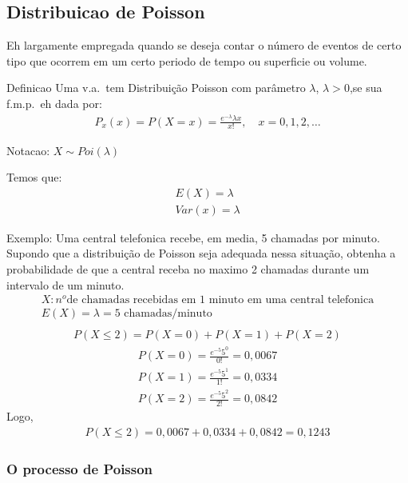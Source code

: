 \documentclass[11pt,a4paper]{book}
\begin{document}
\subsection{Distribuicao de Poisson}
Eh largamente empregada quando se deseja contar o número de eventos de certo tipo
que ocorrem em um certo periodo de tempo ou superficie ou volume.
\begin{description}
\item{Definicao} Uma v.a.\ tem Distribuição Poisson com parâmetro $\lambda$, $\lambda >0$,se sua
  f.m.p.\ eh dada por:
 \begin{align}
   P_{x} (x)= P(X=x)= \frac{e^{-\lambda}\lambda{x}}{x!}, \quad x=0,1,2,\ldots
 \end{align} 
 \item{Notacao}: $X \mathtt{\sim} Poi(\lambda)$
 \item{Temos que}:
   \begin{align}
     E(X)= \lambda \\
     Var(x)= \lambda
   \end{align}
   \item{Exemplo}: Uma central telefonica recebe, em media, 5 chamadas por minuto.
     Supondo que a distribuição de Poisson seja adequada nessa situação, obtenha a 
     probabilidade de que a central receba no maximo 2 chamadas durante um intervalo
     de um minuto.
     \begin{align*}
       X: n^{o} \text{de chamadas recebidas em 1 minuto em uma central telefonica}
       \\
       E(X)=\lambda= \text{5 chamadas/minuto}\\
     \end{align*}
     \begin{align*}
       P(X \leq 2)= P(X=0)+ P(X=1)+P(X=2)
     \end{align*}
     \begin{align*}
       P(X=0) = \frac{e^{-5}5^0}{0!}= 0,0067\\
       P(X=1) = \frac{e^{-5}5^1}{1!}= 0,0334\\
       P(X=2) = \frac{e^{-5}5^2}{2!}= 0,0842
     \end{align*}
     Logo,
     \begin{align*}
       P(X \leq 2)= 0,0067+0,0334+0,0842=0,1243
     \end{align*}
   \end{description}
     \subsubsection{O processo de Poisson}
     
\end{document}
